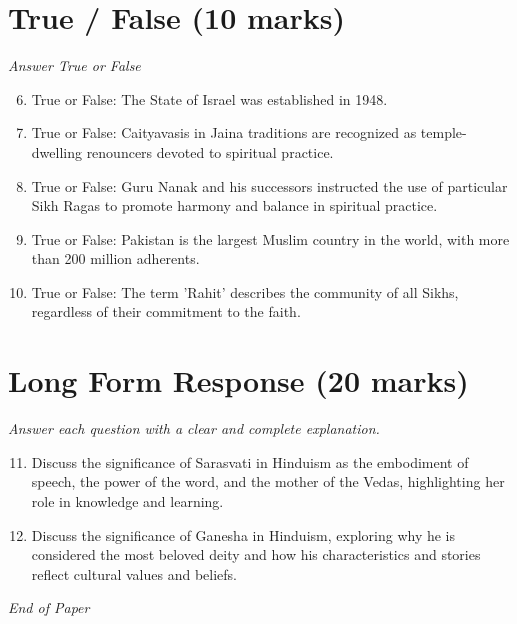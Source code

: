 \documentclass[12pt]{article}
\begin{document}
\section*{True / False (10 marks)}
\textit{Answer True or False}
\begin{enumerate}[label=\arabic*.]
\setcounter{enumi}{5}
\item True or False: The State of Israel was established in 1948.
\item True or False: Caityavasis in Jaina traditions are recognized as temple-dwelling renouncers devoted to spiritual practice.
\item True or False: Guru Nanak and his successors instructed the use of particular Sikh Ragas to promote harmony and balance in spiritual practice.
\item True or False: Pakistan is the largest Muslim country in the world, with more than 200 million adherents.
\item True or False: The term 'Rahit' describes the community of all Sikhs, regardless of their commitment to the faith.
\end{enumerate}

\section*{Long Form Response (20 marks)}
\textit{Answer each question with a clear and complete explanation.}
\begin{enumerate}[label=\arabic*.]
\setcounter{enumi}{10}
\item Discuss the significance of Sarasvati in Hinduism as the embodiment of speech, the power
of the word, and the mother of the Vedas, highlighting her role in knowledge and learning.
\item Discuss the significance of Ganesha in Hinduism, exploring why he is considered the most
beloved deity and how his characteristics and stories reflect cultural values and beliefs.
\end{enumerate}

\vfill
\noindent\textit{End of Paper}
\end{document}
